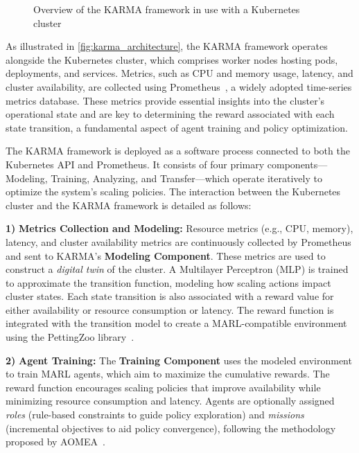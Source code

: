 \documentclass[conference]{IEEEtran}
\begin{document}
\begin{figure}[h!]
    \centering
    
    \caption{Overview of the KARMA framework in use with a Kubernetes cluster}
    \label{fig:karma_architecture}
\end{figure}

As illustrated in \autoref{fig:karma_architecture}, the KARMA framework operates alongside the Kubernetes cluster, which comprises worker nodes hosting pods, deployments, and services. Metrics, such as CPU and memory usage, latency, and cluster availability, are collected using Prometheus~\cite{prometheus}, a widely adopted time-series metrics database. These metrics provide essential insights into the cluster's operational state and are key to determining the reward associated with each state transition, a fundamental aspect of agent training and policy optimization.

The KARMA framework is deployed as a software process connected to both the Kubernetes API and Prometheus. It consists of four primary components—Modeling, Training, Analyzing, and Transfer—which operate iteratively to optimize the system's scaling policies. The interaction between the Kubernetes cluster and the KARMA framework is detailed as follows:

\textbf{1)} \textbf{Metrics Collection and Modeling:} Resource metrics (e.g., CPU, memory), latency, and cluster availability metrics are continuously collected by Prometheus and sent to KARMA's \textbf{Modeling Component}. These metrics are used to construct a \textit{digital twin} of the cluster. A Multilayer Perceptron (MLP) is trained to approximate the transition function, modeling how scaling actions impact cluster states. Each state transition is also associated with a reward value for either availability or resource consumption or latency. The reward function is integrated with the transition model to create a MARL-compatible environment using the PettingZoo library~\cite{Terry2021}.
    
\textbf{2)} \textbf{Agent Training:} The \textbf{Training Component} uses the modeled environment to train MARL agents, which aim to maximize the cumulative rewards. The reward function encourages scaling policies that improve availability while minimizing resource consumption and latency. Agents are optionally assigned \textit{roles} (rule-based constraints to guide policy exploration) and \textit{missions} (incremental objectives to aid policy convergence), following the methodology proposed by AOMEA~\cite{soule2024aomea}.
    
\end{document}
